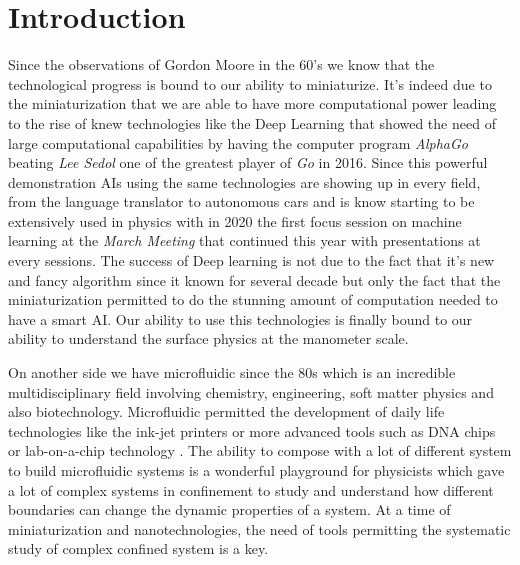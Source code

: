 \section{Introduction}
  \label{sec:Intro}

Since the observations of Gordon Moore in the 60's we know that the technological progress is bound to our ability to miniaturize. It's indeed due to the miniaturization that we are able to have more computational power leading to the rise of knew technologies like the Deep Learning \cite{baraniuk_science_2020} that showed the need of large computational capabilities by having the computer program \textit{AlphaGo} beating \textit{Lee Sedol} one of the greatest player of \textit{Go} in 2016. Since this powerful demonstration AIs using the same technologies are showing up in every field, from the language translator to autonomous cars and is know starting to be extensively used in physics with in 2020 the first focus session on machine learning at the \textit{March Meeting} that continued this year with presentations at every sessions.
The success of Deep learning is not due to the fact that it's new and fancy algorithm since it known for several decade but only the fact that the miniaturization permitted to do the stunning amount of computation needed to have a smart AI. Our ability to use this technologies is finally bound to our ability to understand the surface physics at the manometer scale.

On another side we have microfluidic since the 80s which is an incredible multidisciplinary field involving chemistry, engineering, soft matter physics and also biotechnology. Microfluidic permitted the development of daily life technologies like the ink-jet printers or more advanced tools such as DNA chips \cite{lemieux_overview_1998} or lab-on-a-chip technology \cite{rios_miniaturization_2012}. The ability to compose with a lot of different system to build microfluidic systems is a wonderful playground for physicists which gave a lot of complex systems in confinement to study and understand how different boundaries can change the dynamic properties of a system. At a time of miniaturization and nanotechnologies, the need of tools permitting the systematic study of complex confined system is a key. 


